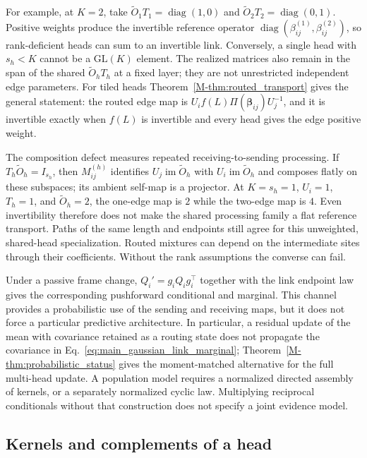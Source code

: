 \documentclass[twoside,11pt]{article}
\begin{document}
For example, at $K=2$, take $\widetilde O_1T_1=\operatorname{diag}(1,0)$ and $\widetilde O_2T_2=\operatorname{diag}(0,1)$. Positive weights produce the invertible reference operator $\operatorname{diag}(\beta_{ij}^{(1)},\beta_{ij}^{(2)})$, so rank-deficient heads can sum to an invertible link. Conversely, a single head with $s_h<K$ cannot be a $\mathrm{GL}(K)$ element. The realized matrices also remain in the span of the shared $\widetilde O_hT_h$ at a fixed layer; they are not unrestricted independent edge parameters. For tiled heads Theorem~\ref{M-thm:routed_transport} gives the general statement: the routed edge map is $U_if(L)\Pi(\boldsymbol\beta_{ij})U_j^{-1}$, and it is invertible exactly when $f(L)$ is invertible and every head gives the edge positive weight.

The composition defect measures repeated receiving-to-sending processing. If $T_h\widetilde O_h=I_{s_h}$, then $M_{ij}^{(h)}$ identifies $U_j\operatorname{im}\widetilde O_h$ with $U_i\operatorname{im}\widetilde O_h$ and composes flatly on these subspaces; its ambient self-map is a projector. At $K=s_h=1$, $U_i=1$, $T_h=1$, and $\widetilde O_h=2$, the one-edge map is $2$ while the two-edge map is $4$. Even invertibility therefore does not make the shared processing family a flat reference transport. Paths of the same length and endpoints still agree for this unweighted, shared-head specialization. Routed mixtures can depend on the intermediate sites through their coefficients. Without the rank assumptions the converse can fail.

Under a passive frame change, $Q_i'=g_iQ_ig_i^\top$ together with the link endpoint law gives the corresponding pushforward conditional and marginal. This channel provides a probabilistic use of the sending and receiving maps, but it does not force a particular predictive architecture. In particular, a residual update of the mean with covariance retained as a routing state does not propagate the covariance in Eq.~\eqref{eq:main_gaussian_link_marginal}; Theorem~\ref{M-thm:probabilistic_status} gives the moment-matched alternative for the full multi-head update. A population model requires a normalized directed assembly of kernels, or a separately normalized cyclic law. Multiplying reciprocal conditionals without that construction does not specify a joint evidence model.

\subsection{Kernels and complements of a head}
\label{supp:link_kernels}
\end{document}
